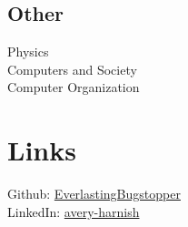 \documentclass[letterpaper]{deedy-resume} %
\begin{document}
\begin{minipage}[t]{0.35\textwidth}
\sectionspace

\subsection{Other}
Physics\\
Computers and Society\\
Computer Organization


\sectionspace %



\section{Links} 

Github: \href{https://github.com/EverlastingBugstopper}{EverlastingBugstopper} \\
LinkedIn: \href{https://linkedin.com/in/avery-harnish}{avery-harnish} \\


\sectionspace %


\end{minipage} %
\hfill
%
%
\end{document}
